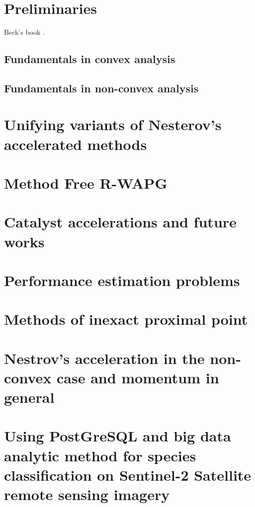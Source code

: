\documentclass[12pt]{article}
\begin{document}
    
\section{Preliminaries}
    Beck's book \cite{beck_first-order_2017}. 
    \subsection{Fundamentals in convex analysis}
    \subsection{Fundamentals in non-convex analysis}

\section{Unifying variants of Nesterov's accelerated methods}\label{sec:unify-nes-acceleration}
    

\section{Method Free R-WAPG}\label{sec:spectral-momentum}

\section{Catalyst accelerations and future works}\label{sec:catalyst}

\section{Performance estimation problems}\label{sec:pep}

\section{Methods of inexact proximal point}\label{sec:inexact-prox}

\section{Nestrov's acceleration in the non-convex case and momentum in general}\label{sec:nes-acc-ncnvx}

\section{Using PostGreSQL and big data analytic method for species classification on Sentinel-2 Satellite remote sensing imagery}




\newpage

\appendix
\end{document}
